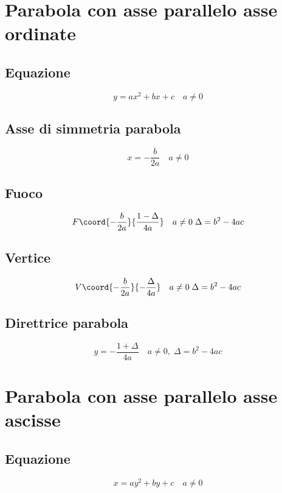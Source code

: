 \chapter{Parabola con asse parallelo asse ordinate}
\section{Equazione}
\begin{equation}
y=ax^2+bx+c\quad a\neq0
\end{equation}
\section{Asse di simmetria parabola}
\begin{equation}
x=-\dfrac{b}{2a}\quad a\neq0
\end{equation}
\section{Fuoco}
\begin{equation}
F\coord{-\dfrac{b}{2a}}{\dfrac{1-\Delta}{4a}}\quad  a\neq0\; \Delta=b^2-4ac
\end{equation}
\section{Vertice}
\begin{equation}
V\coord{-\dfrac{b}{2a}}{-\dfrac{\Delta}{4a}}\quad  a\neq0\; \Delta=b^2-4ac
\end{equation}
\section{Direttrice parabola}
\begin{equation}
y=-\dfrac{1+\Delta}{4a}\quad  a\neq0,\; \Delta=b^2-4ac
\end{equation}
\chapter{Parabola con asse parallelo asse ascisse}
\section{Equazione}
\begin{equation}
x=ay^2+by+c\quad a\neq0
\end{equation}
